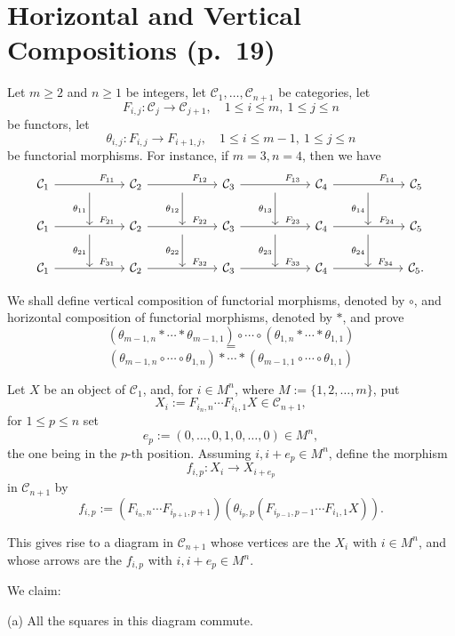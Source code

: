 \documentclass[12pt]{article}
\theoremstyle{remark}%
\newcommand{\n}{\noindent}
\newcommand{\C}{\mathcal C}
\begin{document}
\section{Horizontal and Vertical Compositions (p.~19)} %
%
Let $m\ge2$ and $n\ge1$ be integers, let $\C_1,\dots,\C_{n+1}$ be categories, let 
$$
F_{i,j}:\C_j\to\C_{j+1},\quad1\le i\le m,\ 1\le j\le n
$$
be functors, let 
$$
\theta_{i,j}:F_{i,j}\to F_{i+1,j},\quad1\le i\le m-1,\ 1\le j\le n
$$
be functorial morphisms. For instance, if $m=3,n=4$, then we have 
$$
\begin{tikzcd}
%
\C_1\ar{rr}{}[near end]{F_{11}}&\ar{d}[swap]{\theta_{11}}&\C_2\ar{rr}{}[near end]{F_{12}}&\ar{d}[swap]{\theta_{12}}&\C_3\ar{rr}{}[near end]{F_{13}}&\ar{d}[swap]{\theta_{13}}&\C_4\ar{rr}{}[near end]{F_{14}}&\ar{d}[swap]{\theta_{14}}&\C_5\\ 
%
\C_1\ar{rr}{}[near end]{F_{21}}&{}\ar{d}[swap]{\theta_{21}}&\C_2\ar{rr}{}[near end]{F_{22}}&{}\ar{d}[swap]{\theta_{22}}&\C_3\ar{rr}{}[near end]{F_{23}}&{}\ar{d}[swap]{\theta_{23}}&\C_4\ar{rr}{}[near end]{F_{24}}&{}\ar{d}[swap]{\theta_{24}}&\C_5\\ 
%
\C_1\ar{rr}{}[near end]{F_{31}}&{}&\C_2\ar{rr}{}[near end]{F_{32}}&{}&\C_3\ar{rr}{}[near end]{F_{33}}&{}&\C_4\ar{rr}{}[near end]{F_{34}}&{}&\C_5.
\end{tikzcd}
$$ 

We shall define vertical composition of functorial morphisms, denoted by $\circ$, and horizontal composition of functorial morphisms, denoted by $*$, and prove 
$$
(\theta_{m-1,n}*\cdots*\theta_{m-1,1})\circ\cdots\circ(\theta_{1,n}*\cdots*\theta_{1,1})
$$ 
$$=$$
$$
(\theta_{m-1,n}\circ\cdots\circ\theta_{1,n})*\cdots*(\theta_{m-1,1}\circ\cdots\circ\theta_{1,1})
$$

Let $X$ be an object of $\C_1$, and, for $i\in M^n$, where $M:=\{1,2,\dots,m\}$, put 
$$
X_i:=F_{i_n,n}\cdots F_{i_1,1}X\in\C_{n+1},
$$
for $1\le p\le n$ set 
$$
e_p:=(0,\dots,0,1,0,\dots,0)\in M^n,
$$
the one being in the $p$-th position. Assuming $i,i+e_p\in M^n$, define the morphism 
$$
f_{i,p}:X_i\to X_{i+e_p}
$$
in $\C_{n+1}$ by 
$$
f_{i,p}:=(F_{i_n,n}\cdots F_{i_{p+1},p+1})(\theta_{i_p,p}(F_{i_{p-1},p-1}\cdots F_{i_1,1}X)).
$$

This gives rise to a diagram in $\C_{n+1}$ whose vertices are the $X_i$ with $i\in M^n$, and whose arrows are the $f_{i,p}$ with $i,i+e_p\in M^n$. 

We claim: 

\n(a) All the squares in this diagram commute. 
\end{document}
